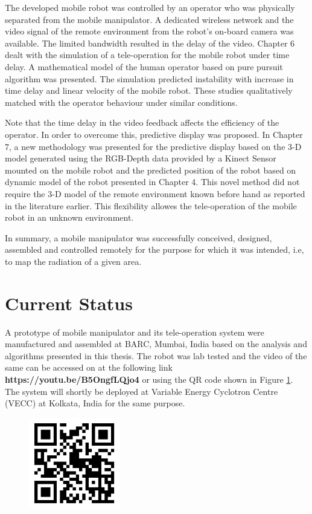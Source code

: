 The developed mobile robot was controlled by an operator who was  physically separated from the mobile manipulator. A dedicated wireless network and the video signal of the remote environment from the robot's on-board camera was available. The limited bandwidth resulted in the delay of the video. 
Chapter 6 dealt with the simulation of a tele-operation for the mobile robot under time delay.
 A mathematical model of the human operator based on pure pursuit algorithm was presented. 
 The simulation  predicted instability with increase in time delay and linear velocity of the mobile robot.
  These studies qualitatively matched with the operator behaviour under similar conditions.

   Note that the time delay in the video feedback affects the efficiency of the operator. 
   In order to overcome this, predictive display was proposed.
   In Chapter 7,  a new methodology was presented for the predictive display based on the 3-D model generated using the RGB-Depth data provided by a Kinect Sensor mounted on the mobile robot and the predicted position of the robot based on dynamic model of the robot presented in Chapter 4.
   This novel method did not require  the 3-D model of the remote environment known before hand as reported in the literature earlier.
   This flexibility allowes the tele-operation of  the mobile robot in an unknown environment. 
   
   In summary, a mobile manipulator was successfully conceived, designed, assembled and controlled remotely  for the purpose for which it was intended, i.e, to map the radiation of a given area.
   
   \section{Current Status} 
   A prototype of  mobile manipulator and its tele-operation system were   manufactured and assembled at BARC, Mumbai, India based on the analysis and algorithms presented in this thesis. The robot was lab tested and the video of the same can be accessed on at the following link\textbf{ https://youtu.be/B5OngfLQjo4 }or using the QR code shown in Figure \ref{fig:QR}. The system will  shortly  be deployed at Variable Energy Cyclotron Centre (VECC) at Kolkata, India for the same purpose. 
\begin{figure}[h]
	\centering
	\includegraphics[height=4cm]{Chapter8/figure/qrcode}
	\label{fig:QR}
\end{figure}

